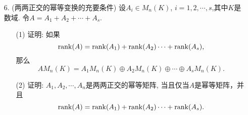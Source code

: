 \begin{itemize}
    \item [6.](两两正交的幂等变换的充要条件)
    设$A_i \in M_n(K)$, $i=1,2,\cdots,s$,其中$K$是数域.
    令$A=A_1 + A_2 +\cdots + A_s$.
    \begin{itemize}
        \item[(1) ] 证明: 如果
              $$ \rank(A) = \rank(A_1) + \rank(A_2) \cdots + \rank(A_s),$$
              那么
              $$AM_n(K) = A_1M_n(K) \oplus A_2M_n(K) \oplus \cdots \oplus A_s M_n(K).$$
        \item [(2) ] 证明: $A_1, A_2, \cdots, A_n$是两两正交的幂等矩阵,
              当且仅当$A$是幂等矩阵，并且
              $$ \rank(A) = \rank(A_1) + \rank(A_2) \cdots + \rank(A_s).$$
    \end{itemize}
    \vspace{5cm}

\end{itemize}
